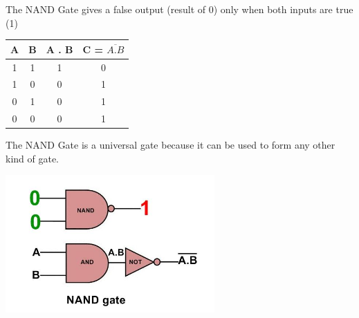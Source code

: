 \documentclass[10pt,a4paper,onecolumn]{article}
\begin{document}
The NAND Gate gives a false output (result of 0) only when both inputs are true (1) \\

\begin{table}[h!]
	\begin{center}
		\begin{tabular}{c|c|c|c}
			\textbf{A} & \textbf{B} &
			\textbf{A . B} & \textbf{C = $\overline{A . B}$}\\
			\hline
			1 & 1 & 1 & 0\\
			\hline
			1 & 0 & 0 & 1\\
			\hline
			0 & 1 & 0 & 1\\
			\hline
			0 & 0 & 0 & 1\\
			\hline
		\end{tabular}
	\end{center}
\end{table} 

\color{red}The NAND Gate is a universal gate because it can be used to form any other kind of gate. \\ \color{black}
\begin{center}\includegraphics[width=8cm]{gst18}\end{center}
\end{document}
